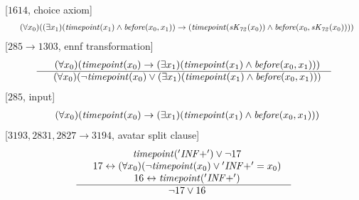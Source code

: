 \documentclass[border=10pt,preview,multi,varwidth=\maxdimen]{standalone}
\newenvironment{VampireStep}{}{}
\newenvironment{VampireInference}{%
   \begin{array}{c}}{\end{array}}
\newenvironment{VampirePremise}%
   {\begin{array}{l}}%
   {\end{array}}
\newenvironment{VampireConclusion}%
   {\begin{array}{l}}%
   {\end{array}}
\newcommand{\VPremiseSeparator}{\\}
\newcommand{\VConclusionSeparator}{\\ \hline}
\newcommand{\Vor}{\vee}
\newcommand{\Vand}{\wedge}
\newcommand{\Vimp}{\rightarrow}
\newcommand{\Viff}{\leftrightarrow}
\begin{document}
\begin{VampireStep}
[$1614$, choice axiom]\\
\[\begin{VampireInference}
\begin{VampireConclusion}
~~(\forall x_{0} )((\exists x_{1} )(\mathit{timepoint} (x_{1}) \Vand \mathit{before} (x_{0},x_{1})) \Vimp (\mathit{timepoint} (\mathit{sK_{72}} (x_{0})) \Vand \mathit{before} (x_{0},\mathit{sK_{72}} (x_{0}))))
\end{VampireConclusion}
\end{VampireInference}
\]
\end{VampireStep}
\begin{VampireStep}
[$285\rightarrow 1303$, ennf transformation]\\
\[\begin{VampireInference}
\begin{VampirePremise}%
~~(\forall x_{0} )(\mathit{timepoint} (x_{0}) \Vimp (\exists x_{1} )(\mathit{timepoint} (x_{1}) \Vand \mathit{before} (x_{0},x_{1})))
\end{VampirePremise}
\VConclusionSeparator
\begin{VampireConclusion}
~~(\forall x_{0} )(\neg \mathit{timepoint} (x_{0}) \Vor (\exists x_{1} )(\mathit{timepoint} (x_{1}) \Vand \mathit{before} (x_{0},x_{1})))
\end{VampireConclusion}
\end{VampireInference}
\]
\end{VampireStep}
\begin{VampireStep}
[$285$, input]\\
\[\begin{VampireInference}
\begin{VampireConclusion}
~~(\forall x_{0} )(\mathit{timepoint} (x_{0}) \Vimp (\exists x_{1} )(\mathit{timepoint} (x_{1}) \Vand \mathit{before} (x_{0},x_{1})))
\end{VampireConclusion}
\end{VampireInference}
\]
\end{VampireStep}
\begin{VampireStep}
[$3193,2831,2827\rightarrow 3194$, avatar split clause]\\
\[\begin{VampireInference}
\begin{VampirePremise}%
~~\mathit{timepoint} (\mathit{'INF+'}) \Vor  \neg 17
\end{VampirePremise}
\VPremiseSeparator
\begin{VampirePremise}%
~~17 \Viff (\forall x_{0} )(\neg \mathit{timepoint} (x_{0}) \Vor \mathit{'INF+'} = x_{0})
\end{VampirePremise}
\VPremiseSeparator
\begin{VampirePremise}%
~~16 \Viff \mathit{timepoint} (\mathit{'INF+'})
\end{VampirePremise}
\VConclusionSeparator
\begin{VampireConclusion}
~~ \neg 17 \Vor 16
\end{VampireConclusion}
\end{VampireInference}
\]
\end{VampireStep}
\end{document}
